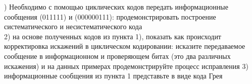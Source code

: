 ) Необходимо с помощью циклических кодов  передать  информационные сообщения (011111) и (000000111): продемонстрировать построение систематического и несистематического кода \\
2) на основе полученных кодов из пункта 1), показать как происходит корректировка искажений в циклическом кодировании: исказите передаваемое сообщение в информационном и проверяющем битах (это два различных искажения) и на данных примерах продемонстрируйте процесс исправления 
3) информационные сообщения из пункта 1 представьте в виде кода Грея